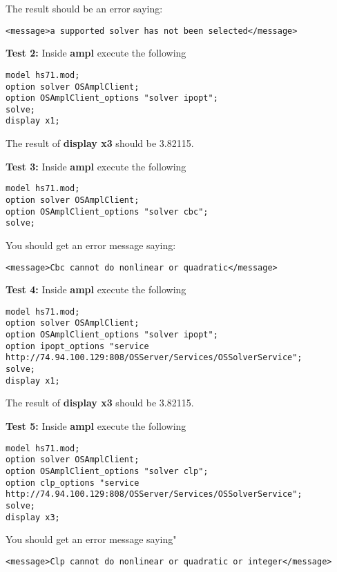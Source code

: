 \begin{itemize}
\begin{itemize}
The result should be an error saying:
\begin{verbatim}
<message>a supported solver has not been selected</message>
\end{verbatim}
 
 \vskip 10pt
 
 {\bf Test 2:}  Inside  {\bf ampl} execute the following
 


\begin{verbatim}
model hs71.mod;
option solver OSAmplClient;
option OSAmplClient_options "solver ipopt";
solve;
display x1;
\end{verbatim}

The result of {\bf display x3} should be 3.82115. 


 \vskip 10pt
 
 {\bf Test 3:}  Inside  {\bf ampl} execute the following
 


\begin{verbatim}
model hs71.mod;
option solver OSAmplClient;
option OSAmplClient_options "solver cbc";
solve;
\end{verbatim}

You should get an error message saying:
\begin{verbatim}
<message>Cbc cannot do nonlinear or quadratic</message>
\end{verbatim}


\vskip 10pt

{\small
{\bf Test 4:}  Inside  {\bf ampl} execute the following
\begin{verbatim}
model hs71.mod;
option solver OSAmplClient;
option OSAmplClient_options "solver ipopt";
option ipopt_options "service http://74.94.100.129:808/OSServer/Services/OSSolverService";
solve;
display x1;
\end{verbatim}
}%

The result of {\bf display x3} should be 3.82115. 


\vskip 10pt

{\small
{\bf Test 5:}  Inside  {\bf ampl} execute the following
\begin{verbatim}
model hs71.mod;
option solver OSAmplClient;
option OSAmplClient_options "solver clp";
option clp_options "service  http://74.94.100.129:808/OSServer/Services/OSSolverService";
solve;
display x3;
\end{verbatim}
}%

You should get an error message saying"
\begin{verbatim}
<message>Clp cannot do nonlinear or quadratic or integer</message>
\end{verbatim}




\end{itemize}
\end{itemize}
